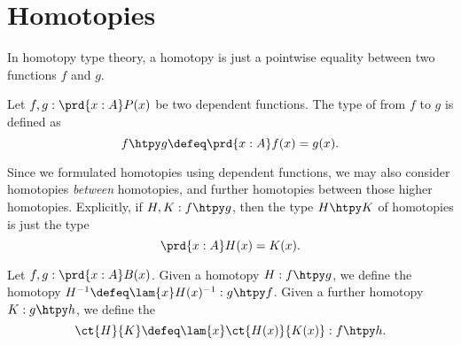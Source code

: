 \section{Homotopies}
In homotopy type theory, a homotopy is just a pointwise equality between two functions $f$ and $g$.

\begin{defn}
Let $f,g:\prd{x:A}P(x)$ be two dependent functions. The type of  from $f$ to $g$ is defined as
\begin{equation*}
f\htpy g \defeq \prd{x:A} f(x)=g(x).
\end{equation*}
\end{defn}

Since we formulated homotopies using dependent functions, we may also consider homotopies \emph{between} homotopies, and further homotopies between those higher homotopies. 
Explicitly, if $H,K:f\htpy g$, then the type $H\htpy K$ of homotopies is just the type
\begin{equation*}
\prd{x:A} H(x)=K(x).
\end{equation*}

\begin{defn}
Let $f,g:\prd{x:A}B(x)$. Given a homotopy $H:f\htpy g$, we define the  homotopy $H^{-1}\defeq \lam{x}H(x)^{-1}:g\htpy f$. Given a further homotopy $K:g\htpy h$, we define the  
\begin{equation*}
\ct{H}{K}\defeq\lam{x}\ct{H(x)}{K(x)}:f\htpy h.
\end{equation*}
\end{defn}

\begin{comment}
\begin{defn}
We define the following \define{whiskering} operations on homotopies:
\begin{enumerate}
\item Suppose $H:f\htpy g$ for two functions $f,g:A\to B$, and let $h:B\to C$. We define
\begin{equation*}
hH\defeq \lam{x}\ap{h}{H(x)}:h\circ f\htpy h\circ g.
\end{equation*}
\item Suppose $f:A\to B$ and $H:g\htpy h$ for two functions $g,h:B\to C$. We define
\begin{equation*}
Hf\defeq\lam{x}H(f(x)):h\circ f\htpy g\circ f.
\end{equation*}
\end{enumerate}
\end{defn}
\end{comment}

